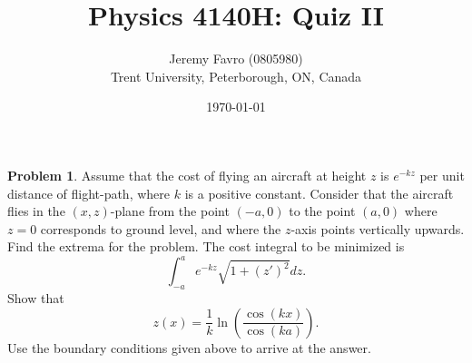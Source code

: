 \documentclass[10pt]{article}
\title{Physics 4140H: Quiz II}
\author{Jeremy Favro (0805980) \\ Trent University, Peterborough, ON, Canada}
\date{\today}
\theoremstyle{definition}
\newtheorem{problem}{Problem}
\begin{document}
\maketitle

\begin{problem}
Assume that the cost of flying an aircraft at height $z$ is $e^{-kz}$ per unit distance of flight-path, where $k$ is a
positive constant. Consider that the aircraft flies in the $(x, z)$-plane from the point $(-a, 0)$ to the point $(a,
  0)$ where $z = 0$ corresponds to ground level, and where the $z$-axis points vertically upwards. Find the
extrema for the problem. The cost integral to be minimized is
$$\int_{-a}^{a}e^{-kz}\sqrt{1+(z')^2}dz.$$
Show that
$$z(x)=\frac{1}{k}\ln(\frac{\cos(kx)}{\cos(ka)}).$$
Use the boundary conditions given above to arrive at the answer.
\end{problem}
\end{document}
